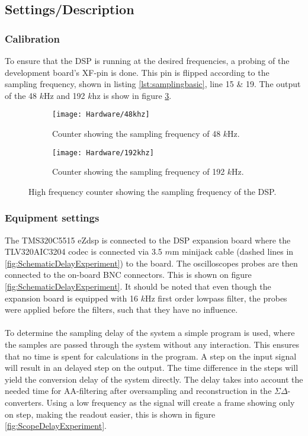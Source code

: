 \subsection{Settings/Description}


\subsubsection{Calibration}
To ensure that the DSP is running at the desired frequencies, a probing of the development board's XF-pin is done. This pin is flipped according to the sampling frequency, shown in listing \ref{lst:samplingbasic}, line 15 \& 19. The output of the 48 $k$Hz and 192 $k$hz is show in figure \ref{fig:countingthefs}. 
\begin{figure}[H]
	\centering
	\begin{subfigure}[b]{.45\textwidth}
		\centering
		\texttt{[image: Hardware/48khz]}
		\caption{Counter showing the sampling frequency of 48 $k$Hz.}
		\label{fig:48khzcounter}
	\end{subfigure}
	\hfill
	\begin{subfigure}[b]{.45\textwidth}
		\centering
		\texttt{[image: Hardware/192khz]}
		\caption{Counter showing the sampling frequency of 192 $k$Hz.}
		\label{fig:192khzcounter}
	\end{subfigure}	
	\caption{High frequency counter showing the sampling frequency of the DSP.}
	\label{fig:countingthefs}
\end{figure}


\subsubsection{Equipment settings}
The TMS320C5515 eZdsp is connected to the DSP expansion board where the TLV320AIC3204 codec is connected via 3.5 $m$m minijack cable (dashed lines in \autoref{fig:SchematicDelayExperiment}) to the board. The oscilloscopes probes are then connected to the on-board BNC connectors. This is shown on figure \ref{fig:SchematicDelayExperiment}. It should be noted that even though the expansion board is equipped with 16 $k$Hz first order lowpass filter, the probes were applied before the filters, such that they have no influence. 
\\\\
To determine the sampling delay of the system a simple program is used, where the samples are passed through the system without any interaction. This ensures that no time is spent for calculations in the program. A step on the input signal will result in an delayed step on the output. The time difference in the steps will yield the conversion delay of the system directly. The delay takes into account the needed time for AA-filtering after oversampling and reconstruction in the $\Sigma\Delta$-converters. Using a low frequency as the signal will create a frame showing only on step, making the readout easier, this is shown in figure \ref{fig:ScopeDelayExperiment}.

